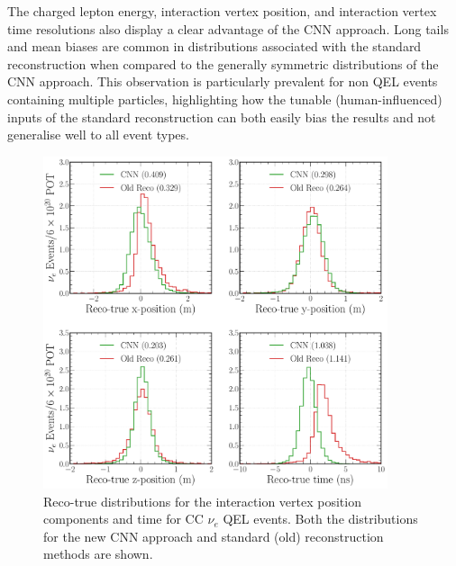 The charged lepton energy, interaction vertex position, and interaction vertex time resolutions
also display a clear advantage of the CNN approach. Long tails and mean biases are common in
distributions associated with the standard reconstruction when compared to the generally symmetric
distributions of the CNN approach. This observation is particularly prevalent for non QEL events
containing multiple particles, highlighting how the tunable (human-influenced) inputs of the
standard reconstruction can both easily bias the results and not generalise well to all event
types.

\begin{figure} %
    \includegraphics[width=0.9\textwidth]{diagrams/7-results/final_vertex_nuel_res_comparison.pdf}
    \caption[Reco-true distributions for the interaction vertex parameters for CC $\nu_{e}$ QEL
        events] {Reco-true distributions for the interaction vertex position components and time
        for CC $\nu_{e}$ QEL events. Both the distributions for the new CNN approach and standard
        (old) reconstruction methods are shown.}
    \label{fig:final_vertex_nuel_res_comparison}
\end{figure}

